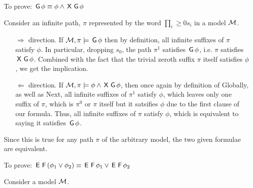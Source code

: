 \question

\begin{alphaparts}
    \questionpart To prove: $\,\textsf{G}\, \phi \equiv \phi \land \,\textsf{X}\, \,\textsf{G}\,
    \phi$

    Consider an infinite path, $\pi$ represented by the word $\prod_i\geq 0 s_i$ in a
    model $\mathcal{M}$.

    \begin{itemize}
        \item[$\Rightarrow$ direction.] 
            If $\mathcal{M}, \pi \models \,\textsf{G}\, \phi$ then by definition, all
            infinite suffixes of $\pi$ satisfy $\phi$. In particular,
            dropping $s_0$, the path $\pi^1$ satisfies $\,\textsf{G}\, \phi$,
            i.e. $\pi$ satisfies $\,\textsf{X}\,\,\textsf{G}\, \phi$. Combined with the
            fact that the trivial zeroth suffix $\pi$ itself satisfies
            $\phi$, we get the implication.
        \item[$\Leftarrow$ direction.] 
            If $\mathcal{M}, \pi \models \phi \land \,\textsf{X}\, \,\textsf{G}\, \phi$, then once
            again by definition of Globally, as well as Next, all infinite
            suffixes of $\pi^1$ satisfy $\phi$, which leaves only one suffix of
            $\pi$, which is $\pi^0$ or $\pi$ itself but it satsifies $\phi$ due
            to the first clause of our formula. Thus, all infinite suffixes of
            $\pi$ satisfy $\phi$, which is equivalent to saying it satisfies
            $\,\textsf{G}\, \phi$.
    \end{itemize}

    Since this is true for any path $\pi$ of the arbitrary model, the two given
    formulae are equivalent.

    \questionpart To prove: $\,\textsf{E}\,\,\textsf{F}\, (\phi_1 \lor \phi_2) \equiv
    \,\textsf{E}\,\,\textsf{F}\, \phi_1 \lor \,\textsf{E}\,\,\textsf{F}\, \phi_2$

    Consider a model $\mathcal{M}$.


\end{alphaparts}
